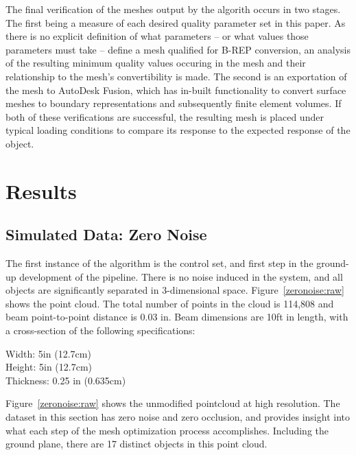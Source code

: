 \documentclass[12pt]{drexelthesis}
\let\Oldsection\section
\renewcommand{\section}{\FloatBarrier\Oldsection}
\begin{document}
The final verification of the meshes output by the algorith occurs in two stages. The first being a measure of each desired quality parameter set in this paper. As there is no explicit definition of what parameters -- or what values those parameters must take -- define a mesh qualified for B-REP conversion, an analysis of the resulting minimum quality values occuring in the mesh and their relationship to the mesh's convertibility is made. The second is an exportation of the mesh to AutoDesk Fusion, which has in-built functionality to convert surface meshes to boundary representations and subsequently finite element volumes. If both of these verifications are successful, the resulting mesh is placed under typical loading conditions to compare its response to the expected response of the object.










\chapter{Results}
\label{chap:results}

\section{Simulated Data: Zero Noise}
The first instance of the algorithm is the control set, and first step in the ground-up development of the pipeline. There is no noise induced in the system, and all objects are significantly separated in 3-dimensional space. Figure~\ref{zeronoise:raw} shows the point cloud. The total number of points in the cloud is 114,808 and beam point-to-point distance is 0.03 in. Beam dimensions are 10ft in length, with a cross-section of the following specifications:


\begin{centering}
Width: 5in (12.7cm)
\\Height: 5in (12.7cm)
\\Thickness: 0.25 in (0.635cm) \\
\end{centering}

Figure~\ref{zeronoise:raw} shows the unmodified pointcloud at high resolution. The dataset in this section has zero noise and zero occlusion, and provides insight into what each step of the mesh optimization process accomplishes. Including the ground plane, there are 17 distinct objects in this point cloud.
\end{document}
